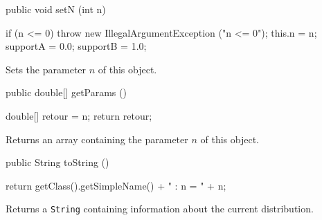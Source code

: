 \begin{code}

   public void setN (int n)\begin{hide} {
      if (n <= 0)
         throw new IllegalArgumentException ("n <= 0");
      this.n = n;
      supportA = 0.0;
      supportB = 1.0;
   }\end{hide}
\end{code}
 \begin{tabb} Sets the parameter $n$ of this object.
 \end{tabb}
 \begin{code}

   public double[] getParams ()\begin{hide} {
      double[] retour = {n};
      return retour;
   }\end{hide}
\end{code}
\begin{tabb}
   Returns an array containing the parameter $n$ of this object.
\end{tabb}
\begin{hide}\begin{code}

   public String toString ()\begin{hide} {
      return getClass().getSimpleName() + " : n = " + n;
   }\end{hide}
\end{code}
\begin{tabb}
   Returns a \texttt{String} containing information about the current distribution.
\end{tabb}\end{hide}
\begin{code}\begin{hide}
}\end{hide}
\end{code}

